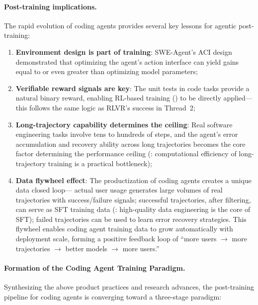 \paragraph{Post-training implications.}
The rapid evolution of coding agents provides several key lessons for agentic post-training:
\begin{enumerate}[leftmargin=*]
  \item \textbf{Environment design is part of training}:
    SWE-Agent's ACI design demonstrated that
    optimizing the agent's action interface can yield gains equal to or even greater than optimizing model parameters;
  \item \textbf{Verifiable reward signals are key}:
    The unit tests in code tasks provide a natural binary reward,
    enabling RL-based training () to be directly applied---
    this follows the same logic as RLVR's success in Thread~2;
  \item \textbf{Long-trajectory capability determines the ceiling}:
    Real software engineering tasks involve tens to hundreds of steps,
    and the agent's error accumulation and recovery ability across long trajectories
    becomes the core factor determining the performance ceiling
    (: computational efficiency of long-trajectory training is a practical bottleneck);
  \item \textbf{Data flywheel effect}:
    The productization of coding agents creates a unique data closed loop---
    actual user usage generates large volumes of real trajectories with success/failure signals;
    successful trajectories, after filtering, can serve as SFT training data
    (: high-quality data engineering is the core of SFT);
    failed trajectories can be used to learn error recovery strategies.
    This flywheel enables coding agent training data to grow automatically with deployment scale,
    forming a positive feedback loop of ``more users $\rightarrow$ more trajectories $\rightarrow$ better models $\rightarrow$ more users.''
\end{enumerate}

\paragraph{Formation of the Coding Agent Training Paradigm.}
Synthesizing the above product practices and research advances,
the post-training pipeline for coding agents is converging toward a three-stage paradigm:

